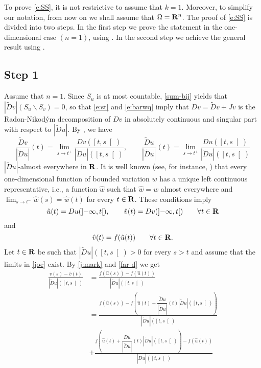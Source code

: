To prove \eqref{e:SS}, it is not restrictive to assume that $k=1$. Moreover,
to simplify our notation, from now on we shall assume that $\Omega =\bold
R^n$. The proof of \eqref{e:SS} is divided into two steps. In the first step we
prove the statement in the one-dimensional case $(n=1)$, using
.
In the second step we achieve the general result using
.

\subsection*{Step 1}
Assume that $n=1$. Since $S_u$ is at most countable,
\eqref{sum-bij}
yields that $|\widetilde{D}v|(S_u\backslash S_v)=0$, so that
\eqref{e:st} and \eqref{e:barwq}
imply that $Dv=\widetilde{D}v+Jv$ is the Radon-Nikod\'ym decomposition of
$Dv$ in absolutely continuous and singular part with respect to $|\widetilde{D}
u|$. By , we have
\begin{equation*}
\frac{\widetilde{D}v}{|\widetilde{D}u|}(t)=\lim_{s\to t^+}
\frac{Dv(\left[t,s\right[)}{|\widetilde{D}u|(\left[t,s\right[)},\qquad
\frac{\widetilde{D}u}{|\widetilde{D}u|}(t)=\lim_{s\to t^+}
\frac{Du(\left[t,s\right[)}{|\widetilde{D}u|(\left[t,s\right[)}\end{equation*}
$|\widetilde{D}u|$-almost everywhere in $\bold R$. It is well known (see,
for instance, \cite[2.5.16]{ste:sint})
that every one-dimensional function of bounded
variation $w$ has a unique left continuous representative, i.e., a function
$\hat w$ such that $\hat w=w$ almost everywhere and $\lim_{s\to
t^-}\hat w(s)=\hat w(t)$ for every $t\in\bold R$. These conditions imply
\begin{equation}
\hat u(t)=Du(\left]-\infty,t\right[),
\qquad \hat v(t)=Dv(\left]-\infty,t\right[)\qquad
\forall t\in\bold R
\end{equation}
and
\begin{equation}\label{alimo}
\hat v(t)=f(\hat u(t))\qquad\forall t\in\bold R.\end{equation}
Let $t\in\bold R$ be
such that $|\widetilde{D}u|(\left[t,s\right[)>0$ for every $s>t$
and assume that the limits in \eqref{joe} exist. By \eqref{j:mark} and
\eqref{far-d}
we get
\begin{equation*}\begin{split}
\frac{\hat v(s)-\hat v(t)}{|\widetilde{D}u|(\left[t,s\right[)}&=\frac
{f(\hat u(s))-f(\hat u(t))}{|\widetilde{D}u|(\left[t,s\right[)}\\
&=\frac{f(\hat u(s))-f(\hat
u(t)+\dfrac{\widetilde{D}u}{|\widetilde{D}u|}(t)|\widetilde{D}u
|(\left[t,s\right[))}{|\widetilde{D}u|(\left[t,s\right[)}\\
&+\frac
{f(\hat u(t)+\dfrac{\widetilde{D}u}{|\widetilde{D}u|}(t)|\widetilde{D}
u|(\left[t,s\right[))-f(\hat u(t))}{|\widetilde{D}u|(\left[t,s\right[)}
\end{split}\end{equation*}
